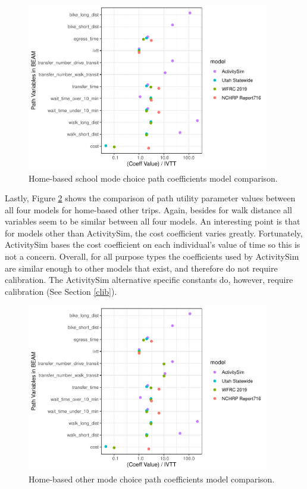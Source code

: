 \documentclass[12pt, oneside, openright]{byuthesis}
\begin{document}
\begin{figure}

{\centering \includegraphics[width=400px]{thesis_files/figure-latex/hbs-1} 

}

\caption{Home-based school mode choice path coefficients model comparison.}\label{fig:hbs}
\end{figure}

Lastly, Figure \ref{fig:hbo} shows the comparison of path utility parameter values between all four models for home-based other trips. Again, besides for walk distance all variables seem to be similar between all four models. An interesting point is that for models other than ActivitySim, the cost coefficient varies greatly. Fortunately, ActivitySim bases the cost coefficient on each individual's value of time so this is not a concern. Overall, for all purpose types the coefficients used by ActivitySim are similar enough to other models that exist, and therefore do not require calibration. The ActivitySim alternative specific constants do, however, require calibration (See Section \ref{clib}).

\begin{figure}

{\centering \includegraphics[width=400px]{thesis_files/figure-latex/hbo-1} 

}

\caption{Home-based other mode choice path coefficients model comparison.}\label{fig:hbo}
\end{figure}
\end{document}
